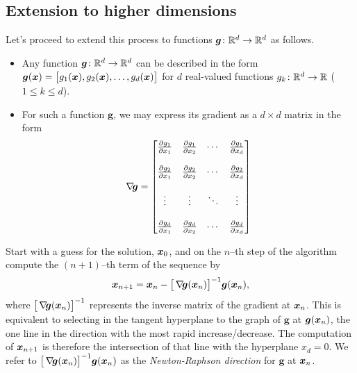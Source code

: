 \subsection{Extension to higher dimensions}

Let's proceed to extend this process to functions $\boldsymbol{g} \colon \mathbb{R}^d \to \mathbb{R}^d$ as follows.
\begin{itemize}
	\item Any function $\boldsymbol{g} \colon \mathbb{R}^d \to \mathbb{R}^d$ can be described in the form $\boldsymbol{g}(\boldsymbol{x}) = \big[ g_1(\boldsymbol{x}), g_2(\boldsymbol{x}), \dotsc, g_d(\boldsymbol{x}) \big]$ for $d$ real-valued functions $g_k\colon \mathbb{R}^d \to \mathbb{R}$ ($1\leq k \leq d$).
	\item For such a function $\boldsymbol{g}$, we may express its gradient as a $d\times d$ matrix in the form
	\begin{equation*}
	\mathop{\nabla\! {\boldsymbol{g}}} = \begin{bmatrix}
	\frac{\partial g_1}{\partial x_1} & \frac{\partial g_1}{\partial x_2} & \dotsb & \frac{\partial g_1}{\partial x_d} \\ \\
	\frac{\partial g_2}{\partial x_1} & \frac{\partial g_2}{\partial x_2} & \dotsb & \frac{\partial g_2}{\partial x_d} \\ \\
	\vdots & \vdots & \ddots & \vdots \\ \\
	\frac{\partial g_d}{\partial x_1} & \frac{\partial g_d}{\partial x_2} & \dotsb & \frac{\partial g_d}{\partial x_d} \\
	\end{bmatrix}
	\end{equation*}
\end{itemize}
Start with a guess for the solution, $\boldsymbol{x}_0$, and on the $n$--th step of the algorithm compute the $(n+1)$--th term of the sequence by
\begin{equation}\label{equation:NewtonMethod}
\boldsymbol{x}_{n+1} = \boldsymbol{x}_n - \big[ \mathop{\nabla\! {\boldsymbol{g}}}(\boldsymbol{x}_n) \big]^{-1} \boldsymbol{g}(\boldsymbol{x}_n),
\end{equation}
where $\big[ \mathop{\nabla\! {\boldsymbol{g}}}(\boldsymbol{x}_n) \big]^{-1}$ represents the inverse matrix of the gradient at $\boldsymbol{x}_n$.  This is equivalent to selecting in the tangent hyperplane to the graph of $\boldsymbol{g}$ at $\boldsymbol{g}(\boldsymbol{x}_n)$, the one line in the direction with the most rapid increase/decrease.  The computation of $\boldsymbol{x}_{n+1}$ is therefore the intersection of that line with the hyperplane $x_d=0$.  We refer to $\big[ \mathop{\nabla\! {\boldsymbol{g}}}(\boldsymbol{x}_n) \big]^{-1} \boldsymbol{g}(\boldsymbol{x}_n)$ as the \emph{Newton-Raphson direction} for $\boldsymbol{g}$ at $\boldsymbol{x}_n$.

